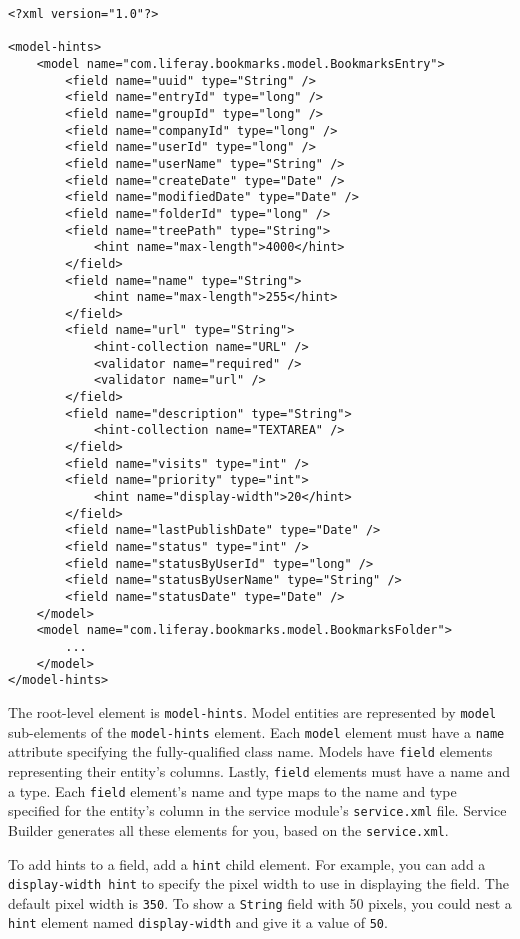 \begin{verbatim}
<?xml version="1.0"?>

<model-hints>
    <model name="com.liferay.bookmarks.model.BookmarksEntry">
        <field name="uuid" type="String" />
        <field name="entryId" type="long" />
        <field name="groupId" type="long" />
        <field name="companyId" type="long" />
        <field name="userId" type="long" />
        <field name="userName" type="String" />
        <field name="createDate" type="Date" />
        <field name="modifiedDate" type="Date" />
        <field name="folderId" type="long" />
        <field name="treePath" type="String">
            <hint name="max-length">4000</hint>
        </field>
        <field name="name" type="String">
            <hint name="max-length">255</hint>
        </field>
        <field name="url" type="String">
            <hint-collection name="URL" />
            <validator name="required" />
            <validator name="url" />
        </field>
        <field name="description" type="String">
            <hint-collection name="TEXTAREA" />
        </field>
        <field name="visits" type="int" />
        <field name="priority" type="int">
            <hint name="display-width">20</hint>
        </field>
        <field name="lastPublishDate" type="Date" />
        <field name="status" type="int" />
        <field name="statusByUserId" type="long" />
        <field name="statusByUserName" type="String" />
        <field name="statusDate" type="Date" />
    </model>
    <model name="com.liferay.bookmarks.model.BookmarksFolder">
        ...
    </model>
</model-hints>
\end{verbatim}

The root-level element is \texttt{model-hints}. Model entities are
represented by \texttt{model} sub-elements of the \texttt{model-hints}
element. Each \texttt{model} element must have a \texttt{name} attribute
specifying the fully-qualified class name. Models have \texttt{field}
elements representing their entity's columns. Lastly, \texttt{field}
elements must have a name and a type. Each \texttt{field} element's name
and type maps to the name and type specified for the entity's column in
the service module's \texttt{service.xml} file. Service Builder
generates all these elements for you, based on the \texttt{service.xml}.

To add hints to a field, add a \texttt{hint} child element. For example,
you can add a \texttt{display-width\ hint} to specify the pixel width to
use in displaying the field. The default pixel width is \texttt{350}. To
show a \texttt{String} field with 50 pixels, you could nest a
\texttt{hint} element named \texttt{display-width} and give it a value
of \texttt{50}.

